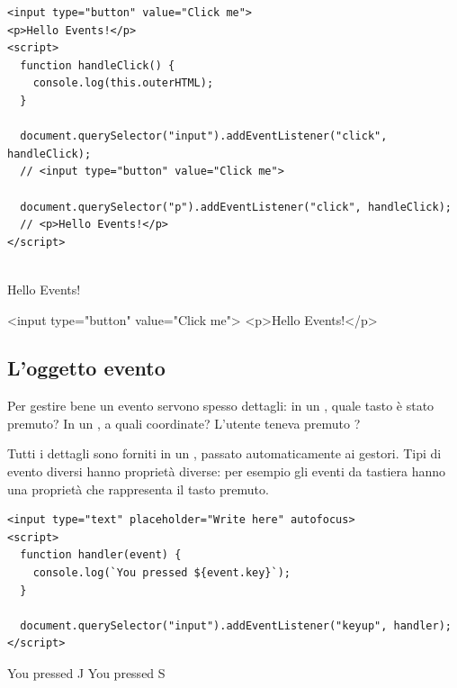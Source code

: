 \begin{affianco}[0.6][c]
\codicepiccolo
\begin{lstlisting}[style=html, name=this-handler.html]
<input type="button" value="Click me">
<p>Hello Events!</p>
<script>
  function handleClick() {
    console.log(this.outerHTML);
  }

  document.querySelector("input").addEventListener("click", handleClick);
  // <input type="button" value="Click me">

  document.querySelector("p").addEventListener("click", handleClick);
  // <p>Hello Events!</p>
</script>
\end{lstlisting}
\risultato
\begin{browser}
  \\[6pt]
  Hello Events!
\end{browser}
\begin{console}
<input type="button" value="Click me">
<p>Hello Events!</p>
\end{console}
\end{affianco}

\subsection{L'oggetto evento}

Per gestire bene un evento servono spesso dettagli: in un , quale
tasto è stato premuto? In un , a quali coordinate? L'utente teneva
premuto ?

Tutti i dettagli sono forniti in un , passato
automaticamente ai gestori. Tipi di evento diversi hanno proprietà diverse: per
esempio gli eventi da tastiera hanno una proprietà  che rappresenta il
tasto premuto.

\begin{affianco}[0.62][c]
\begin{lstlisting}[style=html, name=oggetto-evento.html]
<input type="text" placeholder="Write here" autofocus>
<script>
  function handler(event) {
    console.log(`You pressed ${event.key}`);
  }

  document.querySelector("input").addEventListener("keyup", handler);
</script>
\end{lstlisting}
\risultato
\begin{browser}
\end{browser}
\begin{console}
You pressed J
You pressed S
\end{console}
\end{affianco}


